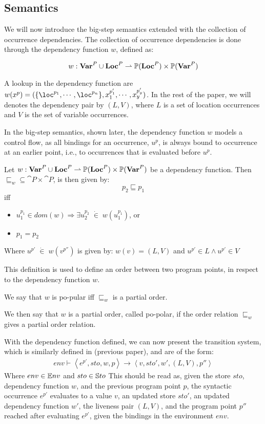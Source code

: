 \documentclass[../../master.tex]{subfiles}
\begin{document}
\subsection{Semantics}\label{sec:sem}
We will now introduce the big-step semantics extended with the collection of occurrence dependencies.
The collection of occurrence dependencies is done through the dependency function $w$, defined as:

$$w:\textbf{Var}^P\cup\textbf{Loc}^P\rightharpoonup\mathbb{P}(\textbf{Loc}^P)\times\mathbb{P}(\textbf{Var}^P)$$

A lookup in the dependency function are $w(x^p)=(\{\loc^{p_1},\cdots,\loc^{p_n}\},x_1^{p'_1},\cdots,x_y^{p'_y})$.
In the rest of the paper, we will denotes the dependency pair by $(L,V)$, where $L$ is a set of location occurrences and $V$ is the set of variable occurrences.

In the big-step semantics, shown later, the dependency function $w$ models a control flow, as all bindings for an occurrence, $u^p$, is always bound to occurrence at an earlier point, i.e., to occurrences that is evaluated before $u^p$.

\begin{definition}[$\sqsubseteq_w$]
	Let $w:\textbf{Var}^P\cup\textbf{Loc}^P\rightharpoonup\mathbb{P}(\textbf{Loc}^P)\times\mathbb{P}(\textbf{Var}^P)$ be a dependency function.
	Then $\sqsubseteq_w\subseteq\cat{P}\times\cat{P}$, is then given by:
	$$p_2\sqsubseteq p_1$$
	iff
	\begin{itemize}
		\item $u_1^{p_1}\in dom(w)\Rightarrow\exists u_2^{p_2}\;\dot{\in}\; w(u_1^{p_1})$, or
		\item $p_1=p_2$
	\end{itemize}
	Where $u^{p'}\;\dot{\in}\;w(v^{p''})$ is given by:
	$w(v)=(L,V)$ and $u^{p'}\in L\wedge u^{p'}\in V$
\end{definition}

This definition is used to define an order between two program points, in respect to the dependency function $w$.

\begin{definition}
	We say that $w$ is po-pular iff $\sqsubseteq_w$ is a partial order.
\end{definition}
We then say that $w$ is a partial order, called po-polar, if the order relation $\sqsubseteq_w$ gives a partial order relation.

With the dependency function defined, we can now present the transition system, which is similarly defined in (previous paper), and are of the form:
\begin{align*}
env\vdash\left\langle e^{p'},sto,w,p\right\rangle\rightarrow\left\langle v,sto',w',(L,V),p''\right\rangle
\end{align*}
Where $env\in\mathbb{E}nv$ and $sto\in\mathbb{S}to$
This should be read as, given the store $sto$, dependency function $w$, and the previous program point $p$, the syntactic occurrence $e^{p'}$ evaluates to a value $v$, an updated store $sto'$, an updated dependency function $w'$, the liveness pair $(L,V)$, and the program point $p''$ reached after evaluating $e^{p'}$, given the bindings in the environment $env$.
\end{document}
